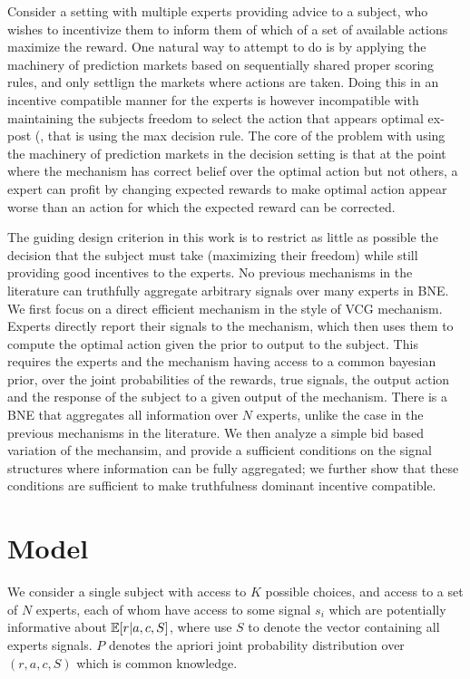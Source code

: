 
Consider a setting with multiple experts providing advice to a subject, who wishes to incentivize them to inform them of which of a set of available actions maximize the reward.
One natural way to attempt to do is by applying the machinery of prediction markets based on sequentially shared proper scoring rules, and only settlign the markets where actions are taken. Doing this in an incentive compatible manner for the experts is however incompatible with maintaining the subjects freedom to select the action that appears optimal ex-post (\cite{othman2010decision,  chen2014eliciting}, that is using the max decision rule. 
The core of the problem with using the machinery of prediction markets in the decision setting is that at the point where the mechanism has correct belief over the optimal action but not others, a expert  can profit by changing expected rewards to make optimal action appear worse than an action for which the expected reward can be corrected.


The guiding design criterion in this work is to restrict as little as possible the decision that the subject must take (maximizing their freedom) while still providing good incentives to the experts. No previous mechanisms in the literature can truthfully aggregate arbitrary signals over many experts in BNE. 
We first focus on a direct efficient mechanism in the style of VCG mechanism. Experts directly report their signals to the mechanism, which then uses them to compute the optimal action given the prior to output to the subject. This requires  the experts and the mechanism having access to a common bayesian prior, over the joint probabilities of the rewards, true signals, the output action and the response of the subject to a given output of the mechanism. There is a BNE that aggregates all information over $N$ experts, unlike the case in the previous mechanisms in the literature.
We then analyze a simple bid based variation of the mechansim, and provide a sufficient conditions on the signal structures where information can be fully aggregated; we further show that these conditions are sufficient to make truthfulness dominant incentive compatible.  


\section{Model}

We consider a single subject with access to $K$ possible choices, and access to a set of $N$ experts, each of whom have access to some signal $s_i$ which are potentially informative about $\operatorname*{\mathbb E}[r|a,c,S]$, where use $S$ to denote the vector containing all experts signals.  $P$ denotes the apriori joint probability distribution over $(r,a,c,S) $ which is common knowledge. 

